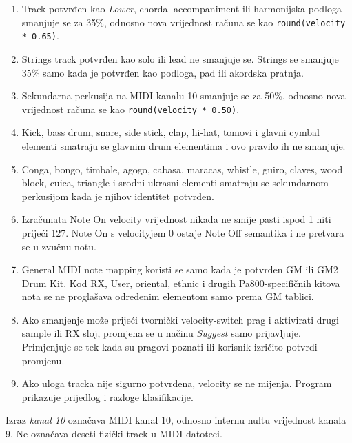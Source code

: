 \documentclass[11pt]{article}
\begin{document}
\begin{enumerate}[label=V\arabic*.]
    \item Track potvrđen kao \emph{Lower}, chordal accompaniment ili harmonijska
    podloga smanjuje se za 35\%, odnosno nova vrijednost računa se kao
    \texttt{round(velocity * 0.65)}.

    \item Strings track potvrđen kao solo ili lead ne smanjuje se. Strings se
    smanjuje 35\% samo kada je potvrđen kao podloga, pad ili akordska pratnja.

    \item Sekundarna perkusija na MIDI kanalu 10 smanjuje se za 50\%, odnosno
    nova vrijednost računa se kao \texttt{round(velocity * 0.50)}.

    \item Kick, bass drum, snare, side stick, clap, hi-hat, tomovi i glavni
    cymbal elementi smatraju se glavnim drum elementima i ovo pravilo ih ne
    smanjuje.

    \item Conga, bongo, timbale, agogo, cabasa, maracas, whistle, guiro,
    claves, wood block, cuica, triangle i srodni ukrasni elementi smatraju se
    sekundarnom perkusijom kada je njihov identitet potvrđen.

    \item Izračunata Note On velocity vrijednost nikada ne smije pasti ispod 1
    niti prijeći 127. Note On s velocityjem 0 ostaje Note Off semantika i ne
    pretvara se u zvučnu notu.

    \item General MIDI note mapping koristi se samo kada je potvrđen GM ili GM2
    Drum Kit. Kod RX, User, oriental, ethnic i drugih Pa800-specifičnih kitova
    nota se ne proglašava određenim elementom samo prema GM tablici.

    \item Ako smanjenje može prijeći tvornički velocity-switch prag i aktivirati
    drugi sample ili RX sloj, promjena se u načinu \emph{Suggest} samo prijavljuje.
    Primjenjuje se tek kada su pragovi poznati ili korisnik izričito potvrdi
    promjenu.

    \item Ako uloga tracka nije sigurno potvrđena, velocity se ne mijenja.
    Program prikazuje prijedlog i razloge klasifikacije.
\end{enumerate}

Izraz \emph{kanal 10} označava MIDI kanal 10, odnosno internu nultu vrijednost
kanala 9. Ne označava deseti fizički track u MIDI datoteci.
\end{document}
